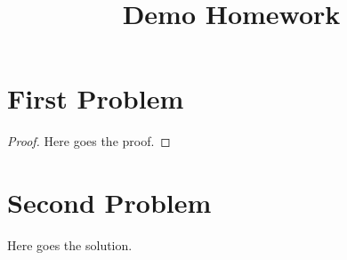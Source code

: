 \documentclass{homework}
\title{Demo Homework}
\begin{document}
\maketitle
\section{First Problem}
\begin{proof}
	Here goes the proof.
\end{proof}
\newpage
\section{Second Problem}
\begin{solution}
	Here goes the solution.
\end{solution}
\end{document}
